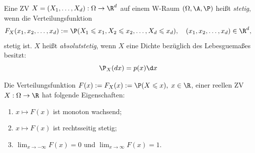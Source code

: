 \documentclass[11pt, a4paper]{article}
\begin{document}
\begin{definition}
    Eine ZV $X = (X_1, \ldots, X_d): \Omega \to \R^d$ auf einem W-Raum $(\Omega, \A, \P)$ heißt \emph{stetig}, wenn die Verteilungsfunktion
    $$F_X(x_1, x_2, \ldots, x_d) := \P(X_1 \leqslant x_1, X_2 \leqslant x_2, \ldots, X_d \leqslant x_d), \quad (x_1, x_2, \ldots, x_d) \in \R^d,$$
    stetig ist. $X$ heißt \emph{absolutstetig}, wenn $X$ eine Dichte bezüglich des Lebesguemaßes besitzt:
    $$\P_X(dx) = p(x)\d x$$
\end{definition}


\begin{lemma}\Theorem
    Die Verteilungsfunktion $F(x) := F_X(x) := \P(X \leqslant x), \; x \in \R$, einer reellen ZV $X: \Omega \to \R$ hat folgende Eigenschaften:
    \begin{enumerate}[label=\alph*)]
        \item $x \mapsto F(x)$ ist monoton wachsend;
        \item $x \mapsto F(x)$ ist rechtsseitig stetig;
        \item $\displaystyle\lim_{x\to-\infty} F(x) = 0$ und $\displaystyle\lim_{x\to\infty} F(x) = 1$.
    \end{enumerate}
\end{lemma}
\end{document}
